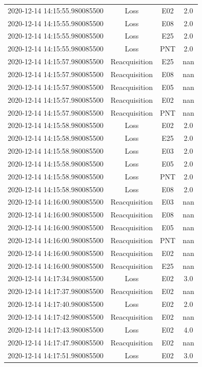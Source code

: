 \begin{enumerate}
\begin{longtabu}{cccc}
2020{-}12{-}14 14:15:55.980085500&Loss&E02&2.0\\%
2020{-}12{-}14 14:15:55.980085500&Loss&E08&2.0\\%
2020{-}12{-}14 14:15:55.980085500&Loss&E25&2.0\\%
2020{-}12{-}14 14:15:55.980085500&Loss&PNT&2.0\\%
2020{-}12{-}14 14:15:57.980085500&Reacquisition&E25&nan\\%
2020{-}12{-}14 14:15:57.980085500&Reacquisition&E08&nan\\%
2020{-}12{-}14 14:15:57.980085500&Reacquisition&E05&nan\\%
2020{-}12{-}14 14:15:57.980085500&Reacquisition&E02&nan\\%
2020{-}12{-}14 14:15:57.980085500&Reacquisition&PNT&nan\\%
2020{-}12{-}14 14:15:58.980085500&Loss&E02&2.0\\%
2020{-}12{-}14 14:15:58.980085500&Loss&E25&2.0\\%
2020{-}12{-}14 14:15:58.980085500&Loss&E03&2.0\\%
2020{-}12{-}14 14:15:58.980085500&Loss&E05&2.0\\%
2020{-}12{-}14 14:15:58.980085500&Loss&PNT&2.0\\%
2020{-}12{-}14 14:15:58.980085500&Loss&E08&2.0\\%
2020{-}12{-}14 14:16:00.980085500&Reacquisition&E03&nan\\%
2020{-}12{-}14 14:16:00.980085500&Reacquisition&E08&nan\\%
2020{-}12{-}14 14:16:00.980085500&Reacquisition&E05&nan\\%
2020{-}12{-}14 14:16:00.980085500&Reacquisition&PNT&nan\\%
2020{-}12{-}14 14:16:00.980085500&Reacquisition&E02&nan\\%
2020{-}12{-}14 14:16:00.980085500&Reacquisition&E25&nan\\%
2020{-}12{-}14 14:17:34.980085500&Loss&E02&3.0\\%
2020{-}12{-}14 14:17:37.980085500&Reacquisition&E02&nan\\%
2020{-}12{-}14 14:17:40.980085500&Loss&E02&2.0\\%
2020{-}12{-}14 14:17:42.980085500&Reacquisition&E02&nan\\%
2020{-}12{-}14 14:17:43.980085500&Loss&E02&4.0\\%
2020{-}12{-}14 14:17:47.980085500&Reacquisition&E02&nan\\%
2020{-}12{-}14 14:17:51.980085500&Loss&E02&3.0\\%

\end{longtabu}
\end{enumerate}
